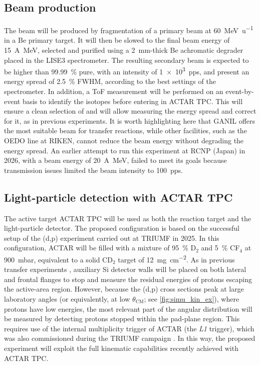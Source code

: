 \documentclass[a4paper, 10pt]{article}
\newcommand{\iso}[2]{\ce{^{#1}#2}}
\begin{document}
\subsection{Beam production}
The \iso{17}{C} beam will be produced by fragmentation of a primary \iso{22}{Ne} beam at \qty{60}{\MeV\per\atomicmassunit} in a Be primary target. It will then be slowed to the final beam energy of \qty{15}{A\MeV}, selected and purified using a \qty{2}{\mm}-thick Be achromatic degrader placed in the LISE3 spectrometer. The resulting secondary beam is expected to be higher than \qty{99.99}{\percent} pure, with an intensity of \qty{1e3}{pps}, and present an energy spread of \qty{2.5}{\percent} FWHM, according to the best settings of the spectrometer. In addition, a ToF measurement will be performed on an event-by-event basis to identify the isotopes before entering in ACTAR TPC. This will ensure a clean selection of \iso{17}{C} and will allow measuring the energy spread and correct for it, as in previous experiments. It is worth highlighting here that GANIL offers the most suitable \iso{17}{C} beam for transfer reactions, while other facilities, such as the OEDO line at RIKEN, cannot reduce the beam energy without degrading the energy spread. An earlier attempt to run this experiment at RCNP (Japan) in 2026, with a beam energy of \qty{20}{A\MeV}, failed to meet its goals because transmission issues limited the beam intensity to \qty{100}{pps}.

\subsection{Light-particle detection with ACTAR TPC}
The active target ACTAR TPC will be used as both the reaction target and the light-particle detector. The proposed configuration is based on the successful setup of the \iso{11}{Li}(d,p)\iso{12}{Li} experiment carried out at TRIUMF in 2025. In this configuration, ACTAR will be filled with a mixture of \qty{95}{\percent} D$_2$ and \qty{5}{\percent} CF$_4$ at \qty{900}{\milli\bar}, equivalent to a solid CD$_2$ target of \qty{12}{\milli\g\per\cm\squared}. As in previous transfer experiments \cite{loisfuentes2026}, auxiliary Si detector walls will be placed on both lateral and frontal flanges to stop and measure the residual energies of protons escaping the active-area region. However, because the (d,p) cross sections peak at large laboratory angles (or equivalently, at low $\theta_{\text{CM}}$; see \autoref{fig:simu_kin_ex}), where protons have low energies, the most relevant part of the angular distribution will be measured by detecting protons stopped within the pad-plane region. This requires use of the internal multiplicity trigger of ACTAR (the \textit{L1} trigger), which was also commissioned during the TRIUMF campaign \cite{blanco-calvino-thesis}. In this way, the proposed experiment will exploit the full kinematic capabilities recently achieved with ACTAR TPC.
\end{document}

